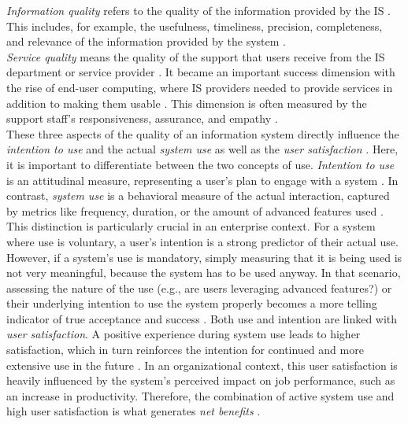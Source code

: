 \documentclass[
	english,
	ruledheaders=section,%
	class=report,%
	thesis={type=bachelor},%
	accentcolor=1b,%
	custommargins=true,%
	marginpar=false,%
	parskip=half-,%
	fontsize=11pt,%
	DIV=14,
]{tudapub}
\begin{document}
\textit{Information quality} refers to the quality of the information provided by the IS \parencite[p.~64]{DeloneMcLean1992ISSuccess}. This includes, for example, the usefulness, timeliness, precision, completeness, and relevance of the information provided by the system \parencite[p.~67]{DeloneMcLean1992ISSuccess}.\\
\textit{Service quality} means the quality of the support that users receive from the IS department or service provider \parencite[p.~18]{DeloneMcLean2003ISSuccessTenYearUpdate}. It became an important success dimension with the rise of end-user computing, where IS providers needed to provide services in addition to making them usable \parencite[p.~18]{DeloneMcLean2003ISSuccessTenYearUpdate}. This dimension is often measured by the support staff's responsiveness, assurance, and empathy \parencite[p.~18]{DeloneMcLean2003ISSuccessTenYearUpdate}.
\\
These three aspects of the quality of an information system directly influence the \textit{intention to use} and the actual \textit{system use} as well as the \textit{user satisfaction} \parencite[p.~23--24]{DeloneMcLean2003ISSuccessTenYearUpdate}. Here, it is important to differentiate between the two concepts of use. \textit{Intention to use} is an attitudinal measure, representing a user's plan to engage with a system \parencite[p.~23]{DeloneMcLean2003ISSuccessTenYearUpdate}. In contrast, \textit{system use} is a behavioral measure of the actual interaction, captured by metrics like frequency, duration, or the amount of advanced features used \parencite[p.~66]{DeloneMcLean1992ISSuccess}. This distinction is particularly crucial in an enterprise context. For a system where use is voluntary, a user's intention is a strong predictor of their actual use. However, if a system's use is mandatory, simply measuring that it is being used is not very meaningful, because the system has to be used anyway. In that scenario, assessing the nature of the use (e.g., are users leveraging advanced features?) or their underlying intention to use the system properly becomes a more telling indicator of true acceptance and success
\parencite[p.~66]{DeloneMcLean1992ISSuccess}. Both use and intention are linked with \textit{user satisfaction}. A positive experience during system use leads to higher satisfaction, which in turn reinforces the intention for continued and more extensive use in the future \parencite[p.~23]{DeloneMcLean2003ISSuccessTenYearUpdate}. In an organizational context, this user satisfaction is heavily influenced by the system's perceived impact on job performance, such as an increase in productivity. Therefore, the combination of active system use and high user satisfaction is what generates \textit{net benefits} \parencite[p.~23]{DeloneMcLean2003ISSuccessTenYearUpdate}.\\
\end{document}
